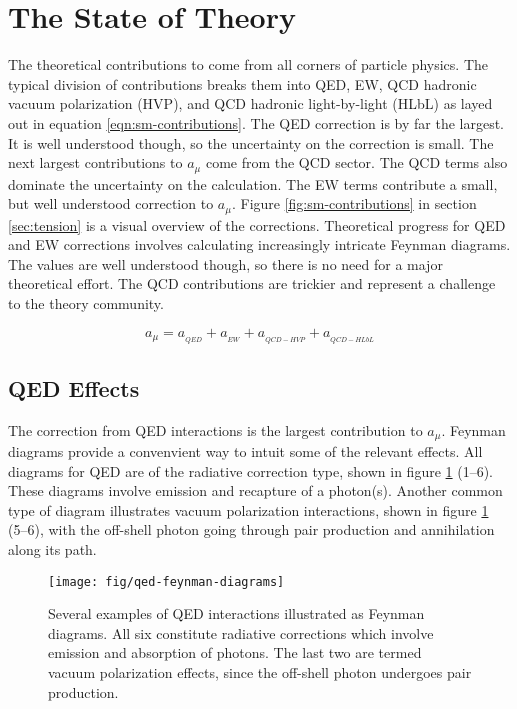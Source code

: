 \section{The State of Theory} \label{sec:theory}

The theoretical contributions to \mugmtwo come from all corners of particle physics.  The typical division of contributions breaks them into QED, EW, QCD hadronic vacuum polarization (HVP), and QCD hadronic light-by-light (HLbL) as layed out in equation \ref{eqn:sm-contributions}. The QED correction is by far the largest. It is well understood though, so the uncertainty on the correction is small.  The next largest contributions to $a_\mu$ come from the QCD sector.  The QCD terms also dominate the uncertainty on the calculation.  The EW terms contribute a small, but well understood correction to $a_\mu$.  Figure \ref{fig:sm-contributions} in section \ref{sec:tension} is a visual overview of the corrections.  Theoretical progress for QED and EW corrections involves calculating increasingly intricate Feynman diagrams. The values are well understood though, so there is no need for a major theoretical effort.  The QCD contributions are trickier and represent a challenge to the theory community.

\begin{equation}
\label{eqn:sm-contributions}
a_\mu = a_{_{QED}} + a_{_{EW}} + a_{_{QCD-HVP}} + a_{_{QCD-HLbL}}
\end{equation}

\subsection{QED Effects} \label{s-sec:theory-qed}

The correction from QED interactions is the largest contribution to $a_\mu$.  Feynman diagrams provide a convenvient way to intuit some of the relevant effects.  All diagrams for QED are of the radiative correction type, shown in figure \ref{fig:qed-feynman-diagrams} (1\hbox{--}6).  These diagrams involve emission and recapture of a photon(s).  Another common type of diagram illustrates vacuum polarization interactions, shown in figure \ref{fig:qed-feynman-diagrams} (5\hbox{--}6), with the off-shell photon going through pair production and annihilation along its path.

\begin{figure}
\centering
\texttt{[image: fig/qed-feynman-diagrams]}
\caption{
    Several examples of QED interactions illustrated as Feynman diagrams.  All six constitute radiative corrections which involve emission and absorption of photons. The last two are termed vacuum polarization effects, since the off-shell photon undergoes pair production.
    \label{fig:qed-feynman-diagrams}
}
\end{figure}

